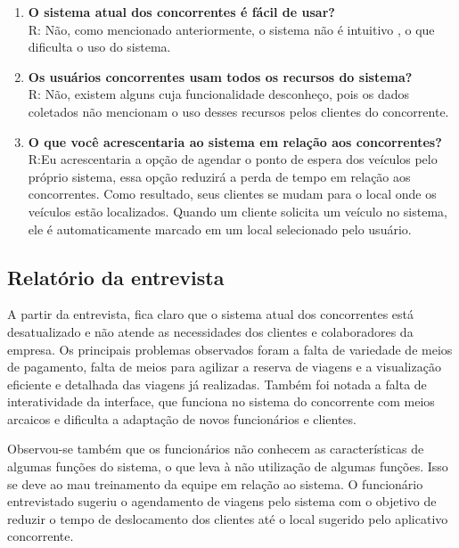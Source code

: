\begin{enumerate}
      \item \textbf{O sistema atual dos concorrentes é fácil de usar?}
            \\R: Não, como mencionado anteriormente, o sistema não é intuitivo , o que dificulta o uso do sistema.\\

      \item \textbf{Os usuários concorrentes usam todos os recursos do sistema?}
            \\R: Não, existem alguns cuja funcionalidade desconheço, pois os dados coletados não mencionam o uso desses recursos pelos clientes do concorrente. \\

      \item \textbf{O que você acrescentaria ao sistema em relação aos concorrentes?}
            \\R:Eu acrescentaria a opção de agendar o ponto de espera dos veículos pelo próprio sistema, essa opção reduzirá a perda de tempo em relação aos concorrentes. Como resultado, seus clientes se mudam para o local onde os veículos estão localizados. Quando um cliente solicita um veículo no sistema, ele é automaticamente marcado em um local selecionado pelo usuário.
\end{enumerate}

\subsection{Relatório da entrevista}

A partir da entrevista, fica claro que o sistema atual dos concorrentes está desatualizado e não atende as necessidades dos clientes e colaboradores da empresa. Os principais problemas observados foram a falta de variedade de meios de pagamento, falta de meios para agilizar a reserva de viagens e a visualização eficiente e detalhada das viagens já realizadas. Também foi notada a falta de interatividade da interface, que funciona no sistema do concorrente com meios arcaicos e dificulta a adaptação de novos funcionários e clientes.

Observou-se também que os funcionários não conhecem as características de algumas funções do sistema, o que leva à não utilização de algumas funções. Isso se deve ao mau treinamento da equipe em relação ao sistema. O funcionário entrevistado sugeriu o agendamento de viagens pelo sistema com o objetivo de reduzir o tempo de deslocamento dos clientes até o local sugerido pelo aplicativo concorrente.



